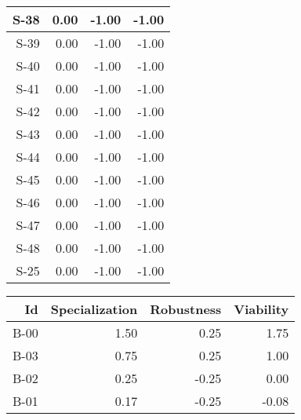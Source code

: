 \begin{tabular}{ | r | r | r | r | }
    \hline
                  S-38  &            0.00  &           -1.00  &           -1.00  \\
    \hline
                  S-39  &            0.00  &           -1.00  &           -1.00  \\
    \hline
                  S-40  &            0.00  &           -1.00  &           -1.00  \\
    \hline
                  S-41  &            0.00  &           -1.00  &           -1.00  \\
    \hline
                  S-42  &            0.00  &           -1.00  &           -1.00  \\
    \hline
                  S-43  &            0.00  &           -1.00  &           -1.00  \\
    \hline
                  S-44  &            0.00  &           -1.00  &           -1.00  \\
    \hline
                  S-45  &            0.00  &           -1.00  &           -1.00  \\
    \hline
                  S-46  &            0.00  &           -1.00  &           -1.00  \\
    \hline
                  S-47  &            0.00  &           -1.00  &           -1.00  \\
    \hline
                  S-48  &            0.00  &           -1.00  &           -1.00  \\
    \hline
                  S-25  &            0.00  &           -1.00  &           -1.00  \\
    \hline
\end{tabular}


\begin{tabular}{ | r | r | r | r | }
    \hline
                    Id  &  Specialization  &      Robustness  &       Viability  \\
    \hline
    \hline
                  B-00  &            1.50  &            0.25  &            1.75  \\
    \hline
                  B-03  &            0.75  &            0.25  &            1.00  \\
    \hline
                  B-02  &            0.25  &           -0.25  &            0.00  \\
    \hline
                  B-01  &            0.17  &           -0.25  &           -0.08  \\
    \hline
\end{tabular}



